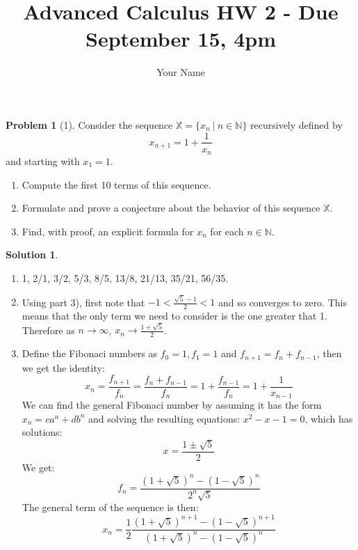 \documentclass{article}
\theoremstyle{definition}
\newtheorem*{soln}{Solution}
\newtheorem*{prob}{Problem}
\theoremstyle{theorem}
\newcommand{\N}{\mathbb{N}}
\begin{document}
\title{Advanced Calculus HW 2 - Due September 15, 4pm}
\author{Your Name}
\maketitle



\begin{prob}[1]
Consider the sequence $\mathbb{X} = \{x_n \ | \ n \in \N\}$ recursively defined by $$x_{n+1} = 1 + \frac{1}{x_n}$$ and starting with $x_1 = 1$.
\begin{enumerate}
    \item Compute the first 10 terms of this sequence.
    \item Formulate and prove a conjecture about the behavior of this sequence $\mathbb{X}$.
    \item Find, with proof, an explicit formula for $x_n$ for each $n \in \N$.
\end{enumerate}
\end{prob}
\begin{soln}
    \begin{enumerate}
        \item 1, 2/1, 3/2, 5/3, 8/5, 13/8, 21/13, 35/21, 56/35.
        \item Using part 3), first note that $-1<\frac{\sqrt 5 - 1}{2}<1$ and so converges to zero. This means that the only term we need to consider is the  one greater that 1. Therefore as $n\to \infty$, $x_n \to \frac{1+\sqrt 5}{2}$.
        \item Define the Fibonaci numbers as $f_0 = 1, f_1=1$ and $f_{n+1}= f_n + f_{n-1}$, then we get the identity:
            $$x_n = \frac{f_{n+1}}{f_n} = \frac{f_n+f_{n-1}}{f_n} = 1+ \frac{f_{n-1}}{f_n} = 1+ \frac 1{x_{n-1}}$$
            We can find the general Fibonaci number by assuming it has the form $x_n = ca^n + db^n$ and solving the resulting equations: $x^2-x-1=0$, which has solutions:
            $$x = \frac{1\pm \sqrt{5}}{2}$$
            We get:
             $$f_n = \frac{(1+\sqrt 5)^n - (1-\sqrt 5)^n}{2^n\sqrt 5}$$
             The general term of the sequence is then:
             $$x_n = \frac 12\frac{(1+\sqrt 5)^{n+1} - (1-\sqrt 5)^{n+1}}{(1+\sqrt 5)^n - (1-\sqrt 5)^n}$$
    \end{enumerate}


\end{soln}
\vspace{1in}
\end{document}
